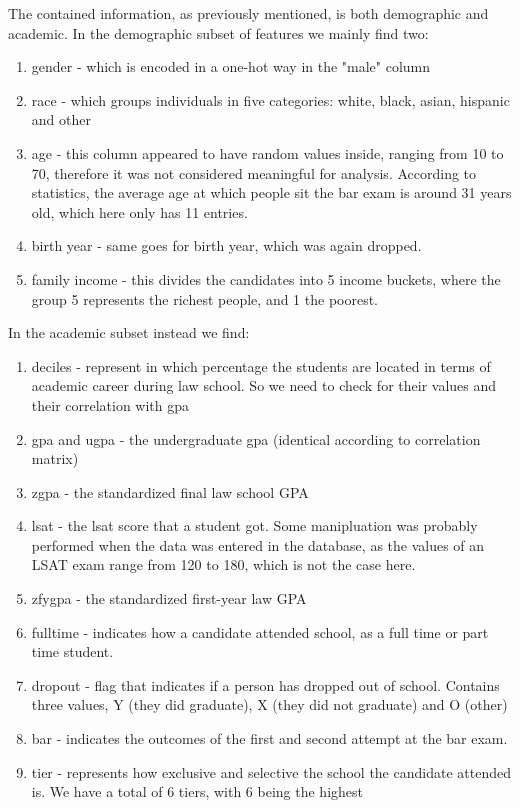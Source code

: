 \documentclass{article}
\begin{document}
The contained information, as previously mentioned, is both demographic and academic. In the demographic subset of features we mainly find two:
\begin{enumerate}
    \item gender - which is encoded in a one-hot way in the "male" column
    \item race - which groups individuals in five categories: white, black, asian, hispanic and other
    \item age - this column appeared to have random values inside, ranging from 10 to 70, therefore it was not considered meaningful for analysis. According to statistics, the average age at which people sit the bar exam is around 31 years old, which here only has 11 entries.
    \item birth year - same goes for birth year, which was again dropped.
    \item family income - this divides the candidates into 5 income buckets, where the group 5 represents the richest people, and 1 the poorest. 
\end{enumerate}
In the academic subset instead we find: 
\begin{enumerate}
    \item deciles - represent in which percentage the students are located in terms of academic career during law school. So we need to check for their values and their correlation with gpa
    \item gpa and ugpa -  the undergraduate gpa (identical according to correlation matrix)
    \item zgpa - the standardized final law school GPA
    \item lsat - the lsat score that a student got. Some manipluation was probably performed when the data was entered in the database, as the values of an LSAT exam range from 120 to 180, which is not the case here.
    \item zfygpa - the standardized first-year law GPA
    \item fulltime - indicates how a candidate attended school, as a full time or part time student. 
    \item dropout - flag that indicates if a person has dropped out of school. Contains three values, Y (they did graduate), X (they did not graduate) and O (other)
    \item bar - indicates the outcomes of the first and second attempt at the bar exam. 
    \item tier - represents how exclusive and selective the school the candidate attended is. We have a total of 6 tiers, with 6 being the highest
\end{enumerate}
\end{document}
